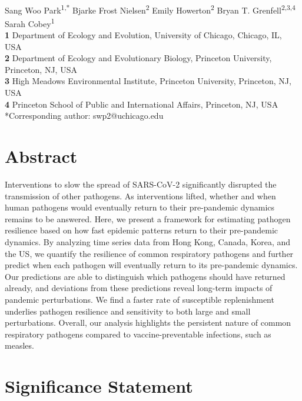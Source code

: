 \documentclass[12pt]{article}
\date{\today}
\begin{document}
\begin{flushleft}{
	\Large
	\textbf{}
}
\newline
\\
Sang Woo Park\textsuperscript{1,*}
Bjarke Frost Nielsen\textsuperscript{2}
Emily Howerton\textsuperscript{2}
Bryan T. Grenfell\textsuperscript{2,3,4}
Sarah Cobey\textsuperscript{1}
\bigskip
\\
\textbf{1} Department of Ecology and Evolution, University of Chicago, Chicago, IL, USA
\\
\textbf{2} Department of Ecology and Evolutionary Biology, Princeton University, Princeton, NJ, USA
\\
\textbf{3} High Meadows Environmental Institute, Princeton University, Princeton, NJ, USA
\\
\textbf{4} Princeton School of Public and International Affairs, Princeton, NJ, USA
\bigskip
*Corresponding author: swp2@uchicago.edu
\end{flushleft}

\section*{Abstract}

Interventions to slow the spread of SARS-CoV-2 significantly disrupted the transmission of other pathogens. As interventions lifted, whether and when human pathogens would eventually return to their pre-pandemic dynamics remains to be answered. Here, we present a framework for estimating pathogen resilience based on how fast epidemic patterns return to their pre-pandemic dynamics. By analyzing time series data from Hong Kong, Canada, Korea, and the US, we quantify the resilience of common respiratory pathogens and further predict when each pathogen will eventually return to its pre-pandemic dynamics. Our predictions are able to distinguish which pathogens should have returned already, and deviations from these predictions reveal long-term impacts of pandemic perturbations. We find a faster rate of susceptible replenishment underlies pathogen resilience and sensitivity to both large and small perturbations. Overall, our analysis highlights the persistent nature of common respiratory pathogens compared to vaccine-preventable infections, such as measles.

\section*{Significance Statement}
\end{document}
